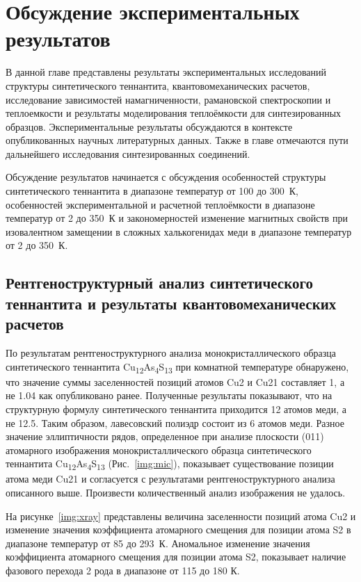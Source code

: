 \chapter{Обсуждение экспериментальных результатов} \label{chapt4}
В данной главе представлены результаты экспериментальных исследований структуры синтетического теннантита,  квантовомеханических расчетов, исследование зависимостей намагниченности, рамановской спектроскопии и теплоемкости и результаты моделирования теплоёмкости для синтезированных образцов. Экспериментальные результаты обсуждаются в контексте опубликованных научных литературных данных. Также в главе отмечаются пути дальнейшего исследования синтезированных соединений. 

Обсуждение результатов начинается с обсуждения особенностей структуры синтетического теннантита в диапазоне температур от 100 до 300~К, особенностей экспериментальной и расчетной теплоёмкости в диапазоне температур от 2 до 350~К и закономерностей изменение магнитных свойств при изовалентном замещении в сложных халькогенидах меди в диапазоне температур от 2 до 350~К. 

 

\section{Рентгеноструктурный анализ синтетического теннантита и результаты квантовомеханических расчетов} \label{sect4_1}

По результатам рентгеноструктурного анализа монокристаллического образца синтетического теннантита Cu\textsubscript{12}As\textsubscript{4}S\textsubscript{13} при комнатной температуре обнаружено, что значение суммы заселенностей позиций атомов Cu2 и Cu21 составляет 1, а не 1.04 как опубликовано ранее\cite{Makovicky_2006}. 
Полученные результаты показывают, что на структурную формулу синтетического теннантита приходится 12 атомов меди, а не 12.5. 
Таким образом, лавесовский полиэдр состоит из 6 атомов меди. 
Разное значение эллиптичности рядов, определенное при анализе плоскости (011) атомарного изображения монокристаллического образца синтетического теннантита Cu\textsubscript{12}As\textsubscript{4}S\textsubscript{13} (Рис.~\ref{img:mic}), показывает существование позиции атома меди Cu21 и согласуется с результатами рентгеноструктурного анализа описанного выше. Произвести количественный анализ изображения не удалось.



На рисунке~\ref{img:xray} представлены величина заселенности позиций атома Cu2 и изменение значения коэффициента атомарного смещения для позиции атома S2 в диапазоне температур от 85 до 293~К. Аномальное изменение значения коэффициента атомарного смещения для позиции атома S2, показывает наличие фазового перехода 2 рода в диапазоне от 115 до 180 К.

